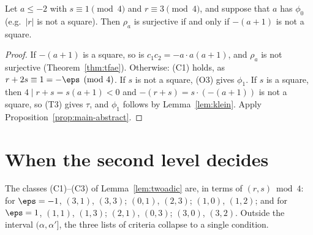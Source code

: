 \begin{corollary}
  \label{cor:li2020-rat}
  \leanok
  Let $a \le -2$ with $s \equiv 1 \pmod 4$ and $r \equiv 3 \pmod 4$, and suppose that $a$ has
  $\phi_0$ (e.g.\ $|r|$ is not a square). Then $\rho_a$ is surjective if and only if $-(a + 1)$
  is not a square.
\end{corollary}
\begin{proof}
  \leanok
  If $-(a + 1)$ is a square, so is $c_1 c_2 = -a \cdot a(a + 1)$, and $\rho_a$ is not surjective
  (Theorem~\ref{thm:tfae}). Otherwise: (C1) holds, as $r + 2s \equiv 1 = -\eps \pmod 4$. If $s$ is
  not a square, (O3) gives $\phi_1$. If $s$ is a square, then $4 \mid r + s = s(a + 1) < 0$ and
  $-(r + s) = s \cdot (-(a+1))$ is not a square, so (T3) gives $\tau$, and $\phi_1$ follows by
  Lemma~\ref{lem:klein}. Apply Proposition~\ref{prop:main-abstract}.
\end{proof}

\section{When the second level decides}

The classes (C1)--(C3) of Lemma~\ref{lem:twoadic} are, in terms of $(r, s) \bmod 4$: for
$\eps = -1$, $(3,1)$, $(3,3)$; $(0,1)$, $(2,3)$; $(1,0)$, $(1,2)$; and for $\eps = 1$, $(1,1)$,
$(1,3)$; $(2,1)$, $(0,3)$; $(3,0)$, $(3,2)$. Outside the interval $(\alpha, \alpha']$, the three
lists of criteria collapse to a single condition.

